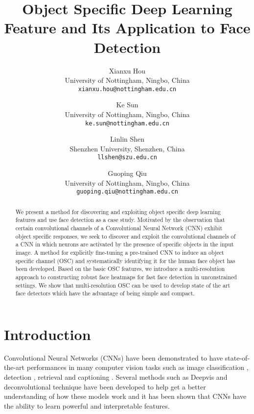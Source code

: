 \documentclass[10pt,twocolumn,letterpaper]{article}
\begin{document}
\title{Object Specific Deep Learning Feature and Its Application to Face Detection}

\author{Xianxu Hou \\
University of Nottingham, Ningbo, China\\
{\tt\small xianxu.hou@nottingham.edu.cn}
\and
Ke Sun \\
University of Nottingham, Ningbo, China\\
{\tt\small ke.sun@nottingham.edu.cn}
\and
Linlin Shen \\
Shenzhen University, Shenzhen, China\\
{\tt\small llshen@szu.edu.cn}
\and
Guoping Qiu \\
University of Nottingham, Ningbo, China\\
{\tt\small guoping.qiu@nottingham.edu.cn}
}

\maketitle
\ifwacvfinal\thispagestyle{empty}\fi



\begin{abstract}
We present a method for discovering and exploiting object specific deep learning features and use face detection as a case study. Motivated by the observation that certain convolutional channels of a Convolutional Neural Network (CNN) exhibit object specific responses, we seek to discover and exploit the convolutional channels of a CNN in which neurons are activated by the presence of specific objects in the input image. A method for explicitly fine-tuning a pre-trained CNN to induce an object specific channel (OSC) and systematically identifying it for the human face object has been developed. Based on the basic OSC features, we introduce a multi-resolution approach to constructing robust face heatmaps for fast face detection in unconstrained settings. We show that multi-resolution OSC can be used to develop state of the art face detectors which have the advantage of being simple and compact.
\end{abstract}

\section{Introduction}
\label{sec:intro}

Convolutional Neural Networks (CNNs) have been demonstrated to have state-of-the-art performances in many computer vision tasks such as image classification \cite{krizhevsky2012imagenet,simonyan2014very}, detection \cite{girshick2014rich,sermanet2013overfeat}, retrieval \cite{babenko2014neural} and captioning \cite{karpathy2015deep}. %
Several methods such as Deepvis \cite{yosinski2015understanding} and deconvolutional technique \cite{zeiler2014visualizing} have been developed to help get a better understanding of how these models work and it has been shown that CNNs have the ability to learn powerful and interpretable features. 
\end{document}
